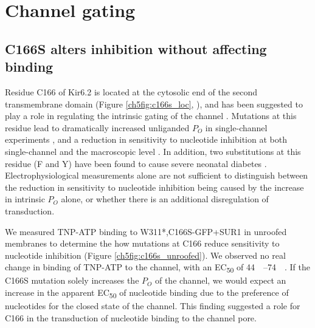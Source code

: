 \section{Channel gating}

\subsection{C166S alters inhibition without affecting binding}

Residue C166 of Kir6.2 is located at the cytosolic end of the second transmembrane domain (Figure \ref{ch5fig:c166s_loc}, \cite{lee_molecular_2017, martin_anti-diabetic_2017, li_structure_2017, puljung_cryo-electron_2018-1}), and has been suggested to play a role in regulating the intrinsic gating of the channel \cite{gloyn_kcnj11_2006, trapp_molecular_1998, ribalet_atp-sensitive_2006, yang_palmitoylation_2020, loussouarn_structure_2000, enkvetchakul_kinetic_2000}.
Mutations at this residue lead to dramatically increased unliganded $P_O$ in single-channel experiments \cite{trapp_molecular_1998, enkvetchakul_kinetic_2000, ribalet_atp-sensitive_2006}, and a reduction in sensitivity to nucleotide inhibition at both single-channel and the macroscopic level \cite{trapp_molecular_1998, enkvetchakul_kinetic_2000, ribalet_atp-sensitive_2006, yang_palmitoylation_2020}.
In addition, two substitutions at this residue (F and Y) have been found to cause severe neonatal diabetes \cite{gloyn_kcnj11_2006}.
Electrophysiological measurements alone are not sufficient to distinguish between the reduction in sensitivity to nucleotide inhibition being caused by the increase in intrinsic $P_O$ alone, or whether there is an additional disregulation of transduction.

We measured TNP-ATP binding to W311*,C166S-GFP+SUR1 in unroofed membranes to determine the how mutations at C166 reduce sensitivity to nucleotide inhibition (Figure \ref{ch5fig:c166s_unroofed}).
We observed no real change in binding of TNP-ATP to the channel, with an EC\textsubscript{50} of \SIrange{44}{74}{\micro\Molar}.
If the C166S mutation solely increases the $P_O$ of the channel, we would expect an increase in the apparent EC\textsubscript{50} of nucleotide binding due to the preference of nucleotides for the closed state of the channel.
This finding suggested a role for C166 in the transduction of nucleotide binding
to the channel pore.

